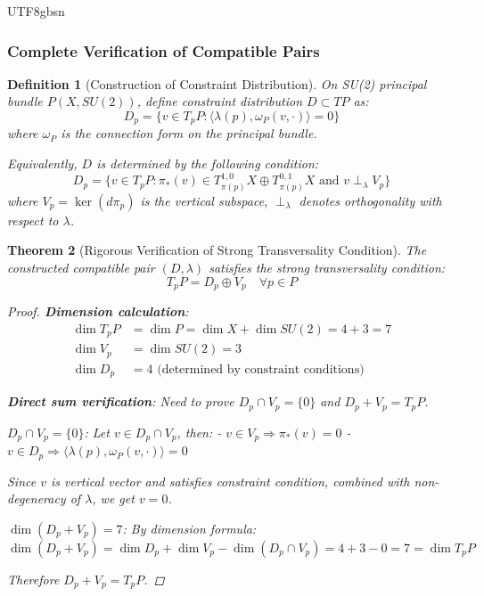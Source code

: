 \documentclass[a4paper,12pt]{extarticle}
\newtheorem{theorem}{Theorem}[section]
\newtheorem{definition}[theorem]{Definition}
\theoremstyle{definition}
\begin{document}
\begin{CJK}{UTF8}{gbsn}
\subsubsection{Complete Verification of Compatible Pairs}
\label{subsubsec:compatible_pair_verification}

\begin{definition}[Construction of Constraint Distribution]
\label{def:constraint_distribution}
On SU(2) principal bundle $P(X, SU(2))$, define constraint distribution $D \subset TP$ as:
$$D_p = \{v \in T_pP : \langle\lambda(p), \omega_P(v, \cdot)\rangle = 0\}$$
where $\omega_P$ is the connection form on the principal bundle.

Equivalently, $D$ is determined by the following condition:
$$D_p = \{v \in T_pP : \pi_*(v) \in T^{1,0}_{\pi(p)}X \oplus T^{0,1}_{\pi(p)}X \text{ and } v \perp_\lambda V_p\}$$
where $V_p = \ker(d\pi_p)$ is the vertical subspace, $\perp_\lambda$ denotes orthogonality with respect to $\lambda$.
\end{definition}

\begin{theorem}[Rigorous Verification of Strong Transversality Condition]
\label{thm:strong_transversality_verification}
The constructed compatible pair $(D, \lambda)$ satisfies the strong transversality condition:
$$T_pP = D_p \oplus V_p \quad \forall p \in P$$

\begin{proof}
\textbf{Dimension calculation}:
\begin{align}
\dim T_pP &= \dim P = \dim X + \dim SU(2) = 4 + 3 = 7\\
\dim V_p &= \dim SU(2) = 3\\
\dim D_p &= 4 \text{ (determined by constraint conditions)}
\end{align}

\textbf{Direct sum verification}:
Need to prove $D_p \cap V_p = \{0\}$ and $D_p + V_p = T_pP$.

$D_p \cap V_p = \{0\}$: Let $v \in D_p \cap V_p$, then:
- $v \in V_p \Rightarrow \pi_*(v) = 0$
- $v \in D_p \Rightarrow \langle\lambda(p), \omega_P(v, \cdot)\rangle = 0$

Since $v$ is vertical vector and satisfies constraint condition, combined with non-degeneracy of $\lambda$, we get $v = 0$.

$\dim(D_p + V_p) = 7$: By dimension formula:
$$\dim(D_p + V_p) = \dim D_p + \dim V_p - \dim(D_p \cap V_p) = 4 + 3 - 0 = 7 = \dim T_pP$$

Therefore $D_p + V_p = T_pP$.


\end{proof}
\end{theorem}
\end{CJK}
\end{document}
